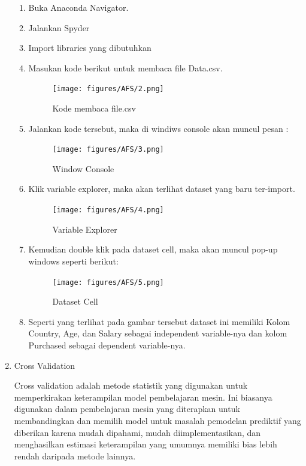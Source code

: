 \begin{enumerate}
		\begin{enumerate}
			\item Buka Anaconda Navigator.
			\item Jalankan Spyder
			\item Import libraries yang dibutuhkan
			\item Masukan kode berikut untuk membaca file Data.csv.
				\begin{figure}[ht]
				\centering
				\texttt{[image: figures/AFS/2.png]}
				\caption{Kode membaca file.csv}
				\label{contoh}
				\end{figure}
			\item Jalankan kode tersebut, maka di windiws console akan muncul pesan :
				\begin{figure}[ht]
				\centering
				\texttt{[image: figures/AFS/3.png]}
				\caption{ Window Console}
				\label{contoh}
				\end{figure}
			\item Klik variable explorer, maka akan terlihat dataset yang baru ter-import.
				\begin{figure}[ht]
				\centering
				\texttt{[image: figures/AFS/4.png]}
				\caption{Variable Explorer}
				\label{contoh}
				\end{figure}
			\item Kemudian double klik pada dataset cell, maka akan muncul pop-up windows seperti berikut: 
				\begin{figure}[ht]
				\centering
				\texttt{[image: figures/AFS/5.png]}
				\caption{ Dataset Cell}
				\label{contoh}
				\end{figure}
			\item Seperti yang terlihat pada gambar tersebut dataset ini memiliki Kolom Country, Age, dan Salary sebagai 		   				independent variable-nya dan kolom Purchased sebagai dependent variable-nya.			
		\end{enumerate}
	

\item Cross Validation \par
Cross validation adalah metode statistik yang digunakan untuk memperkirakan keterampilan model pembelajaran mesin. Ini biasanya digunakan dalam pembelajaran mesin yang diterapkan untuk membandingkan dan memilih model untuk masalah pemodelan prediktif yang diberikan karena mudah dipahami, mudah diimplementasikan, dan menghasilkan estimasi keterampilan yang umumnya memiliki bias lebih rendah daripada metode lainnya.


\end{enumerate}
